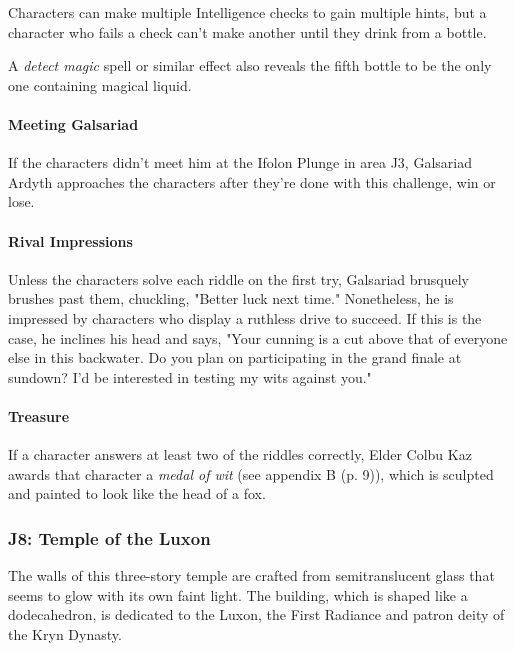 \documentclass[a4paper, 11pt, bg=full, twocolumn, nooutline]{dndbook}
\begin{document}
Characters can make multiple Intelligence checks to gain multiple hints, but a character who fails a check can't make another until they drink from a bottle.

A \textit{detect magic} spell or similar effect also reveals the fifth bottle to be the only one containing magical liquid.

\paragraph{Meeting Galsariad}

If the characters didn't meet him at the Ifolon Plunge in area J3, Galsariad Ardyth approaches the characters after they're done with this challenge, win or lose.

\paragraph{Rival Impressions}

Unless the characters solve each riddle on the first try, Galsariad brusquely brushes past them, chuckling, "Better luck next time." Nonetheless, he is impressed by characters who display a ruthless drive to succeed. If this is the case, he inclines his head and says, "Your cunning is a cut above that of everyone else in this backwater. Do you plan on participating in the grand finale at sundown? I'd be interested in testing my wits against you."

\paragraph{Treasure}

If a character answers at least two of the riddles correctly, Elder Colbu Kaz awards that character a \textit{medal of wit} (see appendix B (p. 9)), which is sculpted and painted to look like the head of a fox.

\subsubsection{J8: Temple of the Luxon}

\begin{DndReadAloud}
The walls of this three-story temple are crafted from semitranslucent glass that seems to glow with its own faint light. The building, which is shaped like a dodecahedron, is dedicated to the Luxon, the First Radiance and patron deity of the Kryn Dynasty.
\end{DndReadAloud}
\end{document}
